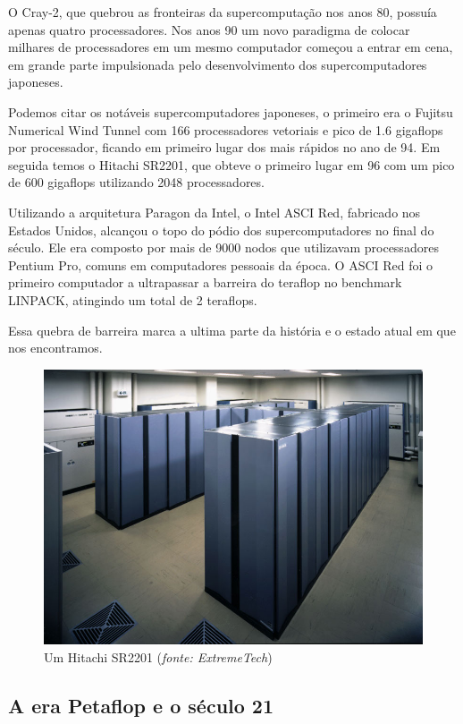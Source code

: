 \documentclass[a4paper]{article}
\begin{document}
O Cray-2, que quebrou as fronteiras da supercomputação nos anos 80, possuía apenas quatro processadores. Nos anos 90 um novo paradigma de colocar milhares de processadores em um mesmo computador começou a entrar em cena, em grande parte impulsionada pelo desenvolvimento dos supercomputadores japoneses.

Podemos citar os notáveis supercomputadores japoneses, o primeiro era o Fujitsu Numerical Wind Tunnel com 166 processadores vetoriais e pico de 1.6 gigaflops por processador, ficando em primeiro lugar dos mais rápidos no ano de 94. Em seguida temos o Hitachi SR2201, que obteve o primeiro lugar em 96 com um pico de 600 gigaflops utilizando 2048 processadores.

Utilizando a arquitetura Paragon da Intel, o Intel ASCI Red, fabricado nos Estados Unidos, alcançou o topo do pódio dos supercomputadores no final do século. Ele era composto por mais de 9000 nodos que utilizavam processadores Pentium Pro, comuns em computadores pessoais da época. O ASCI Red foi o primeiro computador a ultrapassar a barreira do teraflop no benchmark LINPACK, atingindo um total de 2 teraflops.

Essa quebra de barreira marca a ultima parte da história e o estado atual em que nos encontramos.
\begin{figure}[h]
\centering
\includegraphics[scale=0.3]{hitachi1}
\caption{Um Hitachi SR2201 (\textit{fonte: ExtremeTech})}
\end{figure}
\subsection{A era Petaflop e o século 21}
\end{document}

